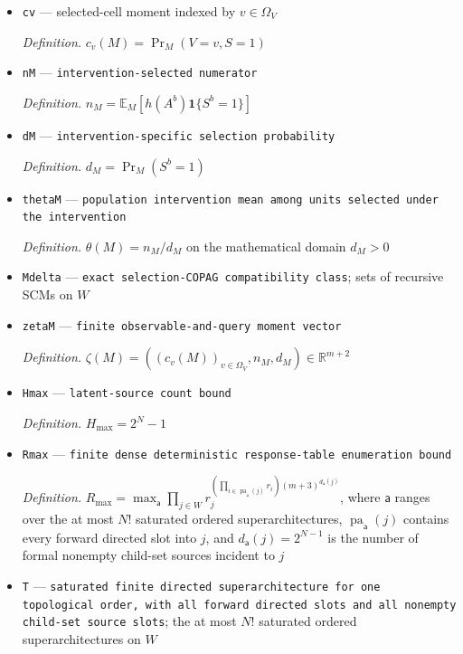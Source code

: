 \documentclass{article}
\begin{document}
\begin{itemize}
  \item \texttt{cv} --- selected-cell moment indexed by \(v\in\Omega_V\)
  \par\smallskip\noindent\emph{Definition.} \(c_v(M)=\Pr_M(V=v,S=1)\)
  \item \texttt{nM} --- \texttt{intervention-\allowbreak{}selected numerator}
  \par\smallskip\noindent\emph{Definition.} \(n_M=\mathbb E_M[h(A^b)\mathbf 1\{S^b=1\}]\)
  \item \texttt{dM} --- \texttt{intervention-\allowbreak{}specific selection probability}
  \par\smallskip\noindent\emph{Definition.} \(d_M=\Pr_M(S^b=1)\)
  \item \texttt{thetaM} --- \texttt{population intervention mean among units selected under the intervention}
  \par\smallskip\noindent\emph{Definition.} \(\theta(M)=n_M/d_M\) on the mathematical domain \(d_M>0\)
  \item \texttt{Mdelta} --- \texttt{exact selection-\allowbreak{}COPAG compatibility class}; sets of recursive SCMs on \(W\)
  \item \texttt{zetaM} --- \texttt{finite observable-\allowbreak{}and-\allowbreak{}query moment vector}
  \par\smallskip\noindent\emph{Definition.} \(\zeta(M)=((c_v(M))_{v\in\Omega_V},n_M,d_M)\in\mathbb R^{m+2}\)
  \item \texttt{Hmax} --- \texttt{latent-\allowbreak{}source count bound}
  \par\smallskip\noindent\emph{Definition.} \(H_{\max}=2^N-1\)
  \item \texttt{Rmax} --- \texttt{finite dense deterministic response-\allowbreak{}table enumeration bound}
  \par\smallskip\noindent\emph{Definition.} \(R_{\max}=\max_{\mathsf a}\prod_{j\in W}r_j^{(\prod_{i\in\operatorname{pa}_{\mathsf a}(j)}r_i)(m+3)^{d_{\mathsf a}(j)}}\), where \(\mathsf a\) ranges over the at most \(N!\) saturated ordered superarchitectures, \(\operatorname{pa}_{\mathsf a}(j)\) contains every forward directed slot into \(j\), and \(d_{\mathsf a}(j)=2^{N-1}\) is the number of formal nonempty child-set sources incident to \(j\)
  \item \texttt{T} --- \texttt{saturated finite directed superarchitecture for one topological order,\allowbreak{} with all forward directed slots and all nonempty child-\allowbreak{}set source slots}; the at most \(N!\) saturated ordered superarchitectures on \(W\)

\end{itemize}
\end{document}
